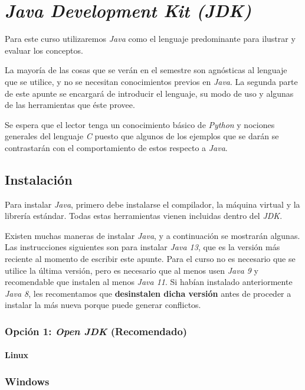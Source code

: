 \chapter{\textit{Java Development Kit (JDK)}}
  Para este curso utilizaremos \textit{Java} como el lenguaje predominante para ilustrar y
  evaluar los conceptos.

  La mayoría de las cosas que se verán en el semestre son agnósticas al lenguaje que se 
  utilice, y no se necesitan conocimientos previos en \textit{Java}.
  La segunda parte de este apunte se encargará de introducir el lenguaje, su modo de uso y
  algunas de las herramientas que éste provee.

  Se espera que el lector tenga un conocimiento básico de \textit{Python} y nociones 
  generales del lenguaje \textit{C} puesto que algunos de los ejemplos que se darán se 
  contrastarán con el comportamiento de estos respecto a \textit{Java}.

  \section{Instalación}
    Para instalar \textit{Java}, primero debe instalarse el compilador, la máquina virtual
    y la librería estándar.
    Todas estas herramientas vienen incluidas dentro del \textit{JDK}.

    Existen muchas maneras de instalar \textit{Java}, y a continuación se mostrarán 
    algunas.
    Las instrucciones siguientes son para instalar \textit{Java 13}, que es la versión más
    reciente al momento de escribir este apunte.
    Para el curso no es necesario que se utilice la última versión, pero es necesario que
    al menos usen \textit{Java 9} y recomendable que instalen al menos \textit{Java 11}.
    Si habían instalado anteriormente \textit{Java 8}, les recomentamos que 
    \textbf{desinstalen dicha versión} antes de proceder a instalar la más nueva porque 
    puede generar conflictos.

    \subsection{Opción 1: \textit{Open JDK} (Recomendado)}
      \subsubsection{Linux}
    \subsection{Windows}
